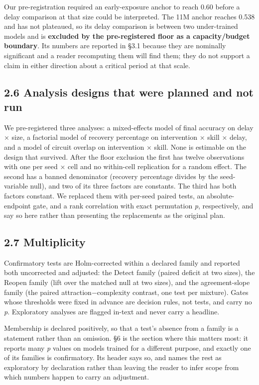 \documentclass[11pt]{article}
\begin{document}
Our pre-registration required an early-exposure anchor to reach 0.60 before a delay
comparison at that size could be interpreted. The 11M anchor reaches 0.538 and has not
plateaued, so its delay comparison is between two under-trained models and is \textbf{excluded by
the pre-registered floor as a capacity/budget boundary}. Its numbers are reported in §3.1
because they are nominally significant and a reader recomputing them will find them; they do
not support a claim in either direction about a critical period at that scale.

\subsection{2.6 Analysis designs that were planned and not run}\label{analysis-designs-that-were-planned-and-not-run}

We pre-registered three analyses: a mixed-effects model of final accuracy on delay × size, a
factorial model of recovery percentage on intervention × skill × delay, and a model of
circuit overlap on intervention × skill. None is estimable on the design that survived. After
the floor exclusion the first has twelve observations with one per seed × cell and no
within-cell replication for a random effect. The second has a banned denominator (recovery
percentage divides by the seed-variable null), and two of its three factors are constants.
The third has both factors constant. We replaced them with per-seed paired tests, an
absolute-endpoint gate, and a rank correlation with exact permutation \emph{p}, respectively, and
say so here rather than presenting the replacements as the original plan.

\subsection{2.7 Multiplicity}\label{multiplicity}

Confirmatory tests are Holm-corrected within a declared family and reported both uncorrected
and adjusted: the Detect family (paired deficit at two sizes), the Reopen family (lift over
the matched null at two sizes), and the agreement-slope family (the paired
attraction−complexity contrast, one test per mixture). Gates whose thresholds were
fixed in advance are decision rules, not tests, and carry no \emph{p}. Exploratory analyses are
flagged in-text and never carry a headline.

Membership is declared positively, so that a test's absence from a family is a statement
rather than an omission. §6 is the section where this matters most: it reports many \emph{p}
values on models trained for a different purpose, and exactly one of its families is
confirmatory. Its header says so, and names the rest as exploratory by declaration rather
than leaving the reader to infer scope from which numbers happen to carry an adjustment.
\end{document}
